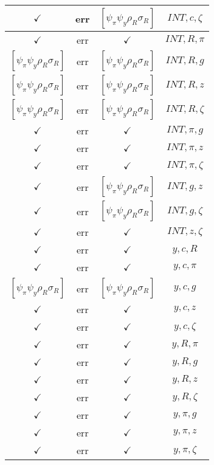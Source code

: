 \documentclass[a4paper,10pt]{article}
\begin{document}
\begin{longtable}{|c|c|c|c|}
\hline
$\checkmark$ & err & $[\psi_\pi \psi_y \rho_R \sigma_R ]$ & ${INT},{c},{\zeta}$ \\
\hline
$\checkmark$ & err & $\checkmark$ & ${INT},{R},{\pi}$ \\
\hline
$[\psi_\pi \psi_y \rho_R \sigma_R ]$ & err & $[\psi_\pi \psi_y \rho_R \sigma_R ]$ & ${INT},{R},{g}$ \\
\hline
$[\psi_\pi \psi_y \rho_R \sigma_R ]$ & err & $[\psi_\pi \psi_y \rho_R \sigma_R ]$ & ${INT},{R},{z}$ \\
\hline
$[\psi_\pi \psi_y \rho_R \sigma_R ]$ & err & $[\psi_\pi \psi_y \rho_R \sigma_R ]$ & ${INT},{R},{\zeta}$ \\
\hline
$\checkmark$ & err & $\checkmark$ & ${INT},{\pi},{g}$ \\
\hline
$\checkmark$ & err & $\checkmark$ & ${INT},{\pi},{z}$ \\
\hline
$\checkmark$ & err & $\checkmark$ & ${INT},{\pi},{\zeta}$ \\
\hline
$\checkmark$ & err & $[\psi_\pi \psi_y \rho_R \sigma_R ]$ & ${INT},{g},{z}$ \\
\hline
$\checkmark$ & err & $[\psi_\pi \psi_y \rho_R \sigma_R ]$ & ${INT},{g},{\zeta}$ \\
\hline
$\checkmark$ & err & $\checkmark$ & ${INT},{z},{\zeta}$ \\
\hline
$\checkmark$ & err & $\checkmark$ & ${y},{c},{R}$ \\
\hline
$\checkmark$ & err & $\checkmark$ & ${y},{c},{\pi}$ \\
\hline
$[\psi_\pi \psi_y \rho_R \sigma_R ]$ & err & $[\psi_\pi \psi_y \rho_R \sigma_R ]$ & ${y},{c},{g}$ \\
\hline
$\checkmark$ & err & $\checkmark$ & ${y},{c},{z}$ \\
\hline
$\checkmark$ & err & $\checkmark$ & ${y},{c},{\zeta}$ \\
\hline
$\checkmark$ & err & $\checkmark$ & ${y},{R},{\pi}$ \\
\hline
$\checkmark$ & err & $\checkmark$ & ${y},{R},{g}$ \\
\hline
$\checkmark$ & err & $\checkmark$ & ${y},{R},{z}$ \\
\hline
$\checkmark$ & err & $\checkmark$ & ${y},{R},{\zeta}$ \\
\hline
$\checkmark$ & err & $\checkmark$ & ${y},{\pi},{g}$ \\
\hline
$\checkmark$ & err & $\checkmark$ & ${y},{\pi},{z}$ \\
\hline
$\checkmark$ & err & $\checkmark$ & ${y},{\pi},{\zeta}$ \\

\end{longtable}
\end{document}
